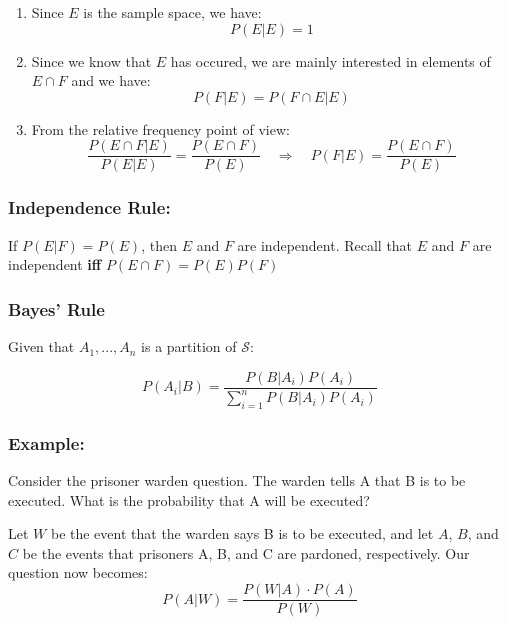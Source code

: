 \documentclass{article}
\begin{document}
\begin{enumerate}
    \begin{enumerate}
        \item Since $E$ is the sample space, we have:
        \begin{equation*}
            P(E|E) = 1
        \end{equation*}

        \item Since we know that $E$ has occured, we are mainly interested in elements of $E \cap F$ and we have:
        \begin{equation*}
            P(F|E) = P(F\cap E | E)
        \end{equation*}

        \item From the relative frequency point of view:
        \begin{equation*}
            \frac{P(E\cap F |E)}{P(E|E)} = \frac{P(E\cap F)}{P(E)} \quad \Rightarrow \quad P(F|E) = \frac{P(E\cap F)}{P(E)}
        \end{equation*}
    \end{enumerate}

    \subsubsection*{Independence Rule:}
    If $P(E|F) = P(E)$, then $E$ and $F$ are independent. Recall that $E$ and $F$ are independent \textbf{iff} $P(E\cap F) = P(E) P(F)$


    \subsubsection{Bayes' Rule}

    Given that $A_1,...,A_n$ is a partition of $\mathcal{S}$:

    \begin{equation*}
        P(A_i|B) = \frac{P(B|A_i)P(A_i)}{\sum_{i=1}^n P(B|A_i)P(A_i)}
    \end{equation*}

    \subsubsection*{Example:}
    Consider the prisoner warden question. The warden tells A that B is to be executed. What is the probability that A will be executed?

    Let $W$ be the event that the warden says B is to be executed, and let $A$, $B$, and $C$ be the events that prisoners A, B, and C are pardoned, respectively. Our question now becomes:
    \begin{equation*}
        P(A|W) = \frac{P(W|A)\cdot P(A)}{P(W)}
    \end{equation*}


\end{enumerate}
\end{document}
